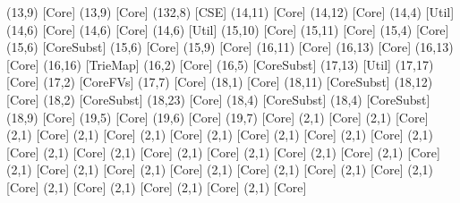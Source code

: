{(13,9) [Core] %
(13,9) [Core] %
(132,8) [CSE] %
(14,11) [Core] %
(14,12) [Core] %
(14,4) [Util] %
(14,6) [Core] %
(14,6) [Core] %
(14,6) [Util] %
(15,10) [Core] %
(15,11) [Core] %
(15,4) [Core] %
(15,6) [CoreSubst] %
(15,6) [Core] %
(15,9) [Core] %
(16,11) [Core] %
(16,13) [Core] %
(16,13) [Core] %
(16,16) [TrieMap] %
(16,2) [Core] %
(16,5) [CoreSubst] %
(17,13) [Util] %
(17,17) [Core] %
(17,2) [CoreFVs] %
(17,7) [Core] %
(18,1) [Core] %
(18,11) [CoreSubst] %
(18,12) [Core] %
(18,2) [CoreSubst] %
(18,23) [Core] %
(18,4) [CoreSubst] %
(18,4) [CoreSubst] %
(18,9) [Core] %
(19,5) [Core] %
(19,6) [Core] %
(19,7) [Core] %
(2,1) [Core] %
(2,1) [Core] %
(2,1) [Core] %
(2,1) [Core] %
(2,1) [Core] %
(2,1) [Core] %
(2,1) [Core] %
(2,1) [Core] %
(2,1) [Core] %
(2,1) [Core] %
(2,1) [Core] %
(2,1) [Core] %
(2,1) [Core] %
(2,1) [Core] %
(2,1) [Core] %
(2,1) [Core] %
(2,1) [Core] %
(2,1) [Core] %
(2,1) [Core] %
(2,1) [Core] %
(2,1) [Core] %
(2,1) [Core] %
(2,1) [Core] %
(2,1) [Core] %
(2,1) [Core] %
(2,1) [Core] %
}
